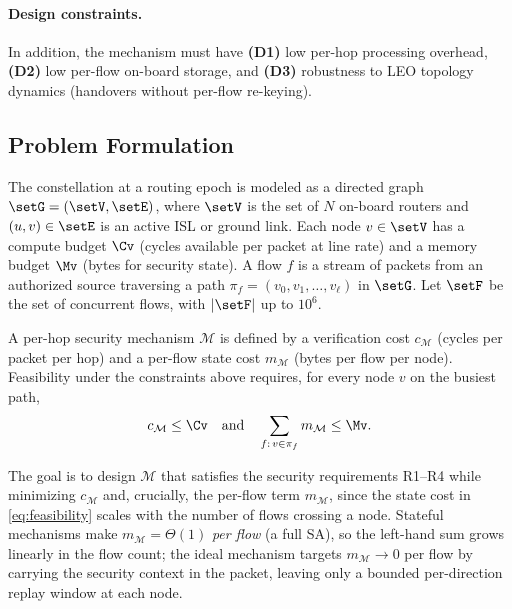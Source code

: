 \paragraph{Design constraints.}
In addition, the mechanism must have \textbf{(D1)} low per-hop processing
overhead, \textbf{(D2)} low per-flow on-board storage, and \textbf{(D3)}
robustness to LEO topology dynamics (handovers without per-flow re-keying).

\subsection{Problem Formulation}
\label{sec:formulation}

The constellation at a routing epoch is modeled as a directed graph
$\setG=(\setV,\setE)$, where $\setV$ is the set of $N$ on-board routers and
$(u,v)\in\setE$ is an active ISL or ground link. Each node $v\in\setV$ has a
compute budget $\Cv$ (cycles available per packet at line rate) and a memory
budget $\Mv$ (bytes for security state). A flow $f$ is a stream of packets from
an authorized source traversing a path $\pi_f=(v_0,v_1,\dots,v_\ell)$ in
$\setG$. Let $\setF$ be the set of concurrent flows, with $|\setF|$ up to
$10^6$.

A per-hop security mechanism $\mathcal{M}$ is defined by a verification cost
$c_{\mathcal{M}}$ (cycles per packet per hop) and a per-flow state cost
$m_{\mathcal{M}}$ (bytes per flow per node). Feasibility under the constraints above requires, for every node $v$ on the busiest path,
\begin{equation}
\label{eq:feasibility}
c_{\mathcal{M}} \le \Cv
\quad\text{and}\quad
\sum_{f:\,v\in\pi_f} m_{\mathcal{M}} \le \Mv .
\end{equation}

The goal is to design $\mathcal{M}$ that satisfies the security requirements
R1--R4 while minimizing $c_{\mathcal{M}}$ and, crucially, the per-flow term
$m_{\mathcal{M}}$, since the state cost in \cref{eq:feasibility} scales with the
number of flows crossing a node. Stateful mechanisms make
$m_{\mathcal{M}}=\Theta(1)$ \emph{per flow} (a full SA), so the left-hand sum
grows linearly in the flow count; the ideal mechanism targets $m_{\mathcal{M}}\to 0$
per flow by carrying the security context in the packet, leaving only a bounded
per-direction replay window at each node.
